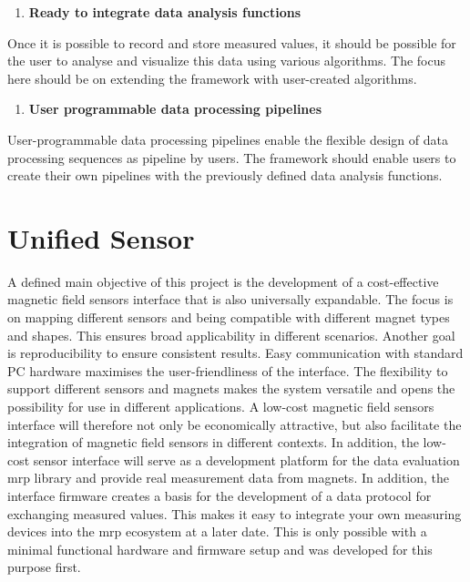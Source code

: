 \begin{enumerate}
\def\labelenumi{\arabic{enumi}.}
\setcounter{enumi}{3}
\tightlist
\item
  \textbf{Ready to integrate data analysis functions}
\end{enumerate}

Once it is possible to record and store measured values, it should be
possible for the user to analyse and visualize this data using various
algorithms. The focus here should be on extending the framework with
user-created algorithms.

\begin{enumerate}
\def\labelenumi{\arabic{enumi}.}
\setcounter{enumi}{4}
\tightlist
\item
  \textbf{User programmable data processing pipelines}
\end{enumerate}

User-programmable data processing pipelines enable the flexible design
of data processing sequences as pipeline by users. The framework should
enable users to create their own pipelines with the previously defined
data analysis functions.

\hypertarget{unified-sensor}{%
\chapter{Unified Sensor}\label{unified-sensor}}

A defined main objective of this project is the development of a
cost-effective magnetic field sensors interface that is also universally
expandable. The focus is on mapping different sensors and being
compatible with different magnet types and shapes. This ensures broad
applicability in different scenarios. Another goal is reproducibility to
ensure consistent results. Easy communication with standard PC hardware
maximises the user-friendliness of the interface. The flexibility to
support different sensors and magnets makes the system versatile and
opens the possibility for use in different applications. A low-cost
magnetic field sensors interface will therefore not only be economically
attractive, but also facilitate the integration of magnetic field
sensors in different contexts. In addition, the low-cost sensor
interface will serve as a development platform for the data evaluation
\gls{mrp} library and provide real measurement data from magnets. In
addition, the interface firmware creates a basis for the development of
a data protocol for exchanging measured values. This makes it easy to
integrate your own measuring devices into the \gls{mrp} ecosystem at a
later date. This is only possible with a minimal functional hardware and
firmware setup and was developed for this purpose first.

